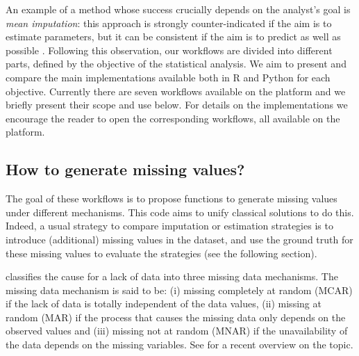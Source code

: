 An example of a method whose success crucially depends on the analyst's goal is \textit{mean imputation}: this approach is strongly counter-indicated if the aim is to estimate parameters, but it can be consistent if the aim is to predict as well as possible \citep{josse_etal_2019}. 
Following this observation, our workflows are divided into different parts, defined by the objective of the statistical analysis. We aim to present and compare the main implementations available both in {R} and {Python} for each objective. Currently there are seven workflows available on the platform and we briefly present their scope and use below. For details on the implementations we encourage the reader to open the corresponding workflows, all available on the  platform.


\subsection{How to generate missing values?}
\label{sec:howtogen}

The goal of these workflows is to propose functions to generate missing values under different mechanisms. This code aims to unify classical solutions to do this. Indeed, a usual strategy to compare imputation or estimation strategies is to introduce (additional) missing values in the dataset, and use the ground truth for these missing values to evaluate the strategies (see the following section).

\citet{rubin_B1976} classifies the cause for a lack of data into three missing data mechanisms. The missing data mechanism is said to be: (i) missing completely at random (MCAR) if the lack of data is totally independent of the data values, (ii) missing at random (MAR) if the process that causes the missing data only depends on the observed values and (iii) missing not at random (MNAR) if the unavailability of the data depends on the missing variables. See \citet{sportisse2021handling} for a recent overview on the topic. 
